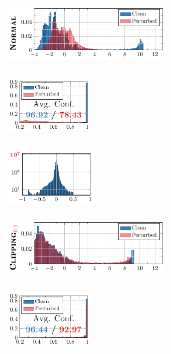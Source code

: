 \begin{figure}[t]
	\centering
	\vspace*{-0.1cm}
	\hspace*{-0.3cm}
	\begin{subfigure}{0.24\textwidth}
		\vspace*{3px}
		
		\includegraphics[height=1.35cm]{c10_q81auunfp_nt_original_logits.pdf}
	\end{subfigure}
	\begin{subfigure}{0.12\textwidth}
		\vspace*{0px}
		
		\includegraphics[height=1.425cm]{c10_q81auunfp_nt_original_confidences.pdf}
	\end{subfigure}
	\begin{subfigure}{0.12\textwidth}
		\vspace*{0px}
		
		\includegraphics[height=1.425cm]{c10_q81auunfp_nt_original_weights.pdf}
	\end{subfigure}
	
	\hspace*{-0.4cm}
	\begin{subfigure}{0.24\textwidth}
		\vspace*{3px}
		
		\includegraphics[height=1.35cm]{c10_q801auunfp_nt_original_logits.pdf}
	\end{subfigure}
	\begin{subfigure}{0.12\textwidth}
		\vspace*{0px}
		
		\includegraphics[height=1.425cm]{c10_q801auunfp_nt_original_confidences.pdf}
	\end{subfigure}
	\begin{subfigure}{0.12\textwidth}
		\vspace*{3px}
		

\end{subfigure}
\end{figure}
